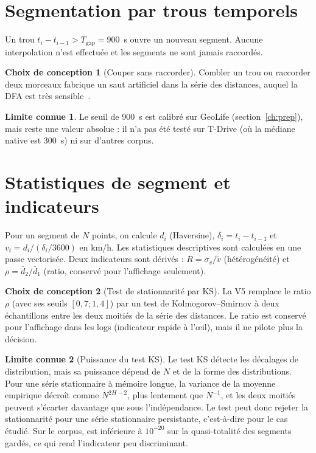 \documentclass[12pt,a4paper]{report}
\theoremstyle{definition}
\newtheorem{choix}{Choix de conception}[chapter]
\newtheorem{limite}{Limite connue}[chapter]
\DeclareRobustCommand{\code}[1]{\texorpdfstring{\texttt{\detokenize{#1}}}{\detokenize{#1}}}
\begin{document}
\section{Segmentation par trous temporels}

Un trou $t_i-t_{i-1} > T_{\mathrm{gap}} = 900$~s ouvre un nouveau segment. Aucune
interpolation n'est effectuée et les segments ne sont jamais raccordés.

\begin{choix}[Couper sans raccorder]
Combler un trou ou raccorder deux morceaux fabrique un saut artificiel dans la série des
distances, auquel la DFA est très sensible~\cite{chen2002}.
\end{choix}

\begin{limite}
Le seuil de 900~s est calibré sur GeoLife (section~\ref{ch:prep}), mais reste une valeur
absolue : il n'a pas été testé sur T-Drive (où la médiane native est 300~s) ni sur
d'autres corpus.
\end{limite}

\section{Statistiques de segment et indicateurs}

Pour un segment de $N$ points, on calcule $d_i$ (Haversine), $\delta_i=t_i-t_{i-1}$ et
$v_i=d_i/(\delta_i/3600)$ en km/h. Les statistiques descriptives sont calculées en une
passe vectorisée. Deux indicateurs sont dérivés : $R = \sigma_v/\tilde v$
(hétérogénéité) et $\rho = \bar d_2/\bar d_1$ (ratio, conservé pour l'affichage
seulement).

\begin{choix}[Test de stationnarité par KS]
La V5 remplace le ratio $\rho$ (avec ses seuils $[0{,}7; 1{,}4]$) par un test de
Kolmogorov--Smirnov à deux échantillons entre les deux moitiés de la série des distances.
Le ratio est conservé pour l'affichage dans les logs (indicateur rapide à l'œil), mais il
ne pilote plus la décision.
\end{choix}

\begin{limite}[Puissance du test KS]
Le test KS détecte les décalages de distribution, mais sa puissance dépend de $N$ et de
la forme des distributions. Pour une série stationnaire à mémoire longue, la variance de
la moyenne empirique décroît comme $N^{2H-2}$, plus lentement que $N^{-1}$, et les deux
moitiés peuvent s'écarter davantage que sous l'indépendance. Le test peut donc rejeter la
stationnarité pour une série stationnaire persistante, c'est-à-dire pour le cas étudié.
Sur le corpus, \code{statio_p_value} est inférieure à $10^{-20}$ sur la quasi-totalité
des segments gardés, ce qui rend l'indicateur peu discriminant.
\end{limite}
\end{document}
